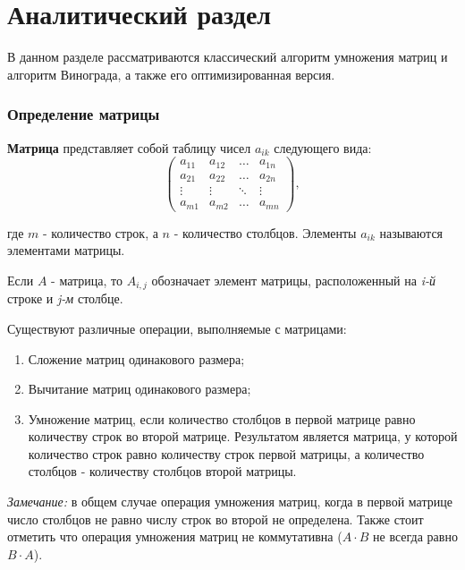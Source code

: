 \chapter{Аналитический раздел}


В данном разделе рассматриваются классический алгоритм умножения матриц и алгоритм Винограда, а также его оптимизированная версия.

\subsection{Определение матрицы}

\textbf{Матрица} \cite{book_matrix} представляет собой таблицу чисел $a_{ik}$ следующего вида:
\begin{equation}
	\begin{pmatrix}
		a_{11} & a_{12} & \ldots & a_{1n}\\
		a_{21} & a_{22} & \ldots & a_{2n}\\
		\vdots & \vdots & \ddots & \vdots\\
		a_{m1} & a_{m2} & \ldots & a_{mn}
	\end{pmatrix},
\end{equation}

где $m$ - количество строк, а $n$ - количество столбцов. Элементы $a_{ik}$ называются элементами матрицы.

Если $A$ - матрица, то $A_{i,j}$ обозначает элемент матрицы, расположенный на \textit{i-й} строке и \textit{j-м} столбце.

Существуют различные операции, выполняемые с матрицами:
\begin{enumerate}
	\item Сложение матриц одинакового размера;
	\item Вычитание матриц одинакового размера;
	\item Умножение матриц, 
	если количество столбцов в первой матрице равно количеству строк во второй матрице.
	Результатом является матрица, у которой количество строк равно количеству строк первой матрицы, 
	а количество столбцов - количеству столбцов второй матрицы. 
\end{enumerate}

\textit{Замечание:} в общем случае операция умножения матриц, 
когда в первой матрице число столбцов не равно числу строк во второй не определена.
Также стоит отметить что операция умножения матриц не коммутативна ($A \cdot B$ не всегда равно $B \cdot A$).

\clearpage

